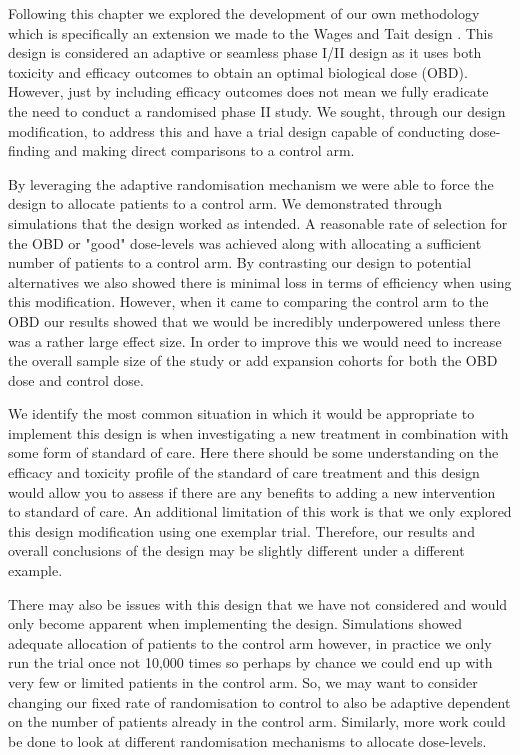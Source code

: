 Following this chapter we explored the development of our own methodology which is specifically an extension we made to the Wages and Tait design \cite{wagesSeamlessPhaseII2015}. This design is considered an adaptive or seamless phase \RN{1}/\RN{2} design as it uses both toxicity and efficacy outcomes to obtain an optimal biological dose (OBD). However, just by including efficacy outcomes does not mean we fully eradicate the need to conduct a randomised phase \RN{2} study. We sought, through our design modification, to address this and have a trial design capable of conducting dose-finding and making direct comparisons to a control arm. 

By leveraging the adaptive randomisation mechanism we were able to force the design to allocate patients to a control arm. We demonstrated through simulations that the design worked as intended. A reasonable rate of selection for the OBD or "good" dose-levels was achieved along with allocating a sufficient number of patients to a control arm. By contrasting our design to potential alternatives we also showed there is minimal loss in terms of efficiency when using this modification. However, when it came to comparing the control arm to the OBD our results showed that we would be incredibly underpowered unless there was a rather large effect size. In order to improve this we would need to increase the overall sample size of the study or add expansion cohorts for both the OBD dose and control dose.   

We identify the most common situation in which it would be appropriate to implement this design is when investigating a new treatment in combination with some form of standard of care. Here there should be some understanding on the efficacy and toxicity profile of the standard of care treatment and this design would allow you to assess if there are any benefits to adding a new intervention to standard of care. An additional limitation of this work is that we only explored this design modification using one exemplar trial. Therefore, our results and overall conclusions of the design may be slightly different under a different example. 

There may also be issues with this design that we have not considered and would only become apparent when implementing the design. Simulations showed adequate allocation of patients to the control arm however, in practice we only run the trial once not 10,000 times so perhaps by chance we could end up with very few or limited patients in the control arm. So, we may want to consider changing our fixed rate of randomisation to control to also be adaptive dependent on the number of patients already in the control arm. Similarly, more work could be done to look at different randomisation mechanisms to allocate dose-levels. 

